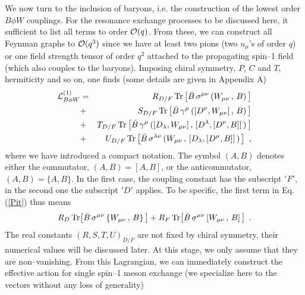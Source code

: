 We now turn to the inclusion of baryons, i.e. the construction of the
lowest order $B\phi W$ couplings. For the resonance exchange processes
to be discussed here, it sufficient to list all terms  to order
${\cal O}(q)$. From these, we can construct all Feynman graphs to
${\cal O}(q^3)$ since we have at least two pions (two $u_\mu$'s of
order $q$) or one field strength tensor of order $q^2$ attached to the
propagating spin--1 field (which also couples to the baryons).
Imposing chiral symmetry, $P$, $C$ and $T$, hermiticity and so on, one finds
(some details are given in Appendix A)
\begin{eqnarray}
{\cal L}_{B\phi W}^{(1)}
& = & R_{D/F} \, {\rm Tr} \, \bigl[ \bar{B} \, \sigma^{\mu \nu} \, (
W_{\mu \nu} \, , \, B) \, \bigr] \nonumber \\
& + & S_{D/F} \, {\rm Tr} \, \bigl[ \bar{B} \, \gamma^\mu \, ( [D^\nu,
W_{\mu \nu}]\, , \, B) \, \bigr] \nonumber \\
& + & T_{D/F} \, {\rm Tr} \, \bigl[ \bar{B} \, \gamma^\mu \, ( [D_\lambda,
W_{\mu \nu}]\, , \, [D^\lambda ,[D^\nu , B]] \, ) \, \bigr]
\nonumber \\
& + & U_{D/F} \, {\rm Tr} \, \bigl[ \bar{B} \, \sigma^{\lambda \nu} \, (
W_{\mu \nu} \, , \, [ D_\lambda , [ D^\mu , B]] \, ) \, \bigr]
\, \, \, ,
\label{Pit}
\end{eqnarray}
\vfill
where we have introduced a compact notation. The symbol $(A,B)$
denotes either the commutator, $(A,B) = [A,B]$, or the anticommutator,
$(A,B) = \{A,B\}$. In the first case, the coupling constant has the
subscript $'F'$, in the second one the subscript $'D'$ applies. To be
specific, the first term in Eq.(\ref{Pit}) thus means
\begin{equation}
R_D \, {\rm Tr} \bigl[ \bar{B} \, \sigma^{\mu \nu} \, \{
W_{\mu \nu} \, , \, B \} \, \bigr] +
R_F \, {\rm Tr} \bigl[ \bar{B} \, \sigma^{\mu \nu} \, [
W_{\mu \nu} \, , \, B ] \, \bigr] \, \, \, .
\label{Pitex}
\end{equation}
The real constants $(R,S,T,U)_{D/F}$ are not fixed by chiral symmetry,
their numerical values will be discussed later. At this stage, we only
assume that they are non--vanishing. From  this Lagrangian, we can
immediately construct the effective action for single spin--1 meson
exchange (we specialize here to the vectors without any loss of generality)
